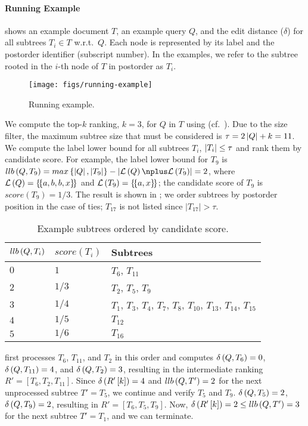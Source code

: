 \paragraph{Running Example}

 shows an example document $T$, an example query $Q$, and the edit distance ($\delta$) for all subtrees $T_i \in T$ w.r.t.\ $Q$. Each node is represented by its label and the postorder identifier (subscript number). In the examples, we refer to the  subtree rooted in the $i$-th node of $T$ in postorder as $T_i$.

\begin{figure}[H]
  \centering
  \texttt{[image: figs/running-example]}
  \caption{Running example.}
  \label{fig:running-example}
\end{figure}

\begin{example}

We compute the top-$k$ ranking, $k = 3$, for $Q$ in $T$ using \simplealg{} (cf.\ ). Due to the size filter, the maximum subtree size that must be considered is $\tau = 2\left| Q \right| + k = 11$. We compute the label lower bound for all subtrees $T_i$, $\left| T_i \right| \leq \tau$ and rank them by candidate score.
%
For example, the label lower bound for $T_9$ is $\LLBshort{Q}{T_9} = \LLB{Q}{T_9} = 2$, where $\mathcal{L} \left( Q \right) = \left\{\!\left\{ a, b, b, x \right\}\!\right\}$ and $\mathcal{L} \left( T_9 \right) = \left\{\!\left\{ a, x \right\}\!\right\}$; the candidate score of $T_9$ is $score(T_9) = 1/3$.
%
The result is shown in ; we order subtrees by postorder position in the case of ties; $T_{17}$ is not listed since $|T_{17}|>\tau$.
\parskip0pt\begin{table}[H]
  \centering
  \caption{Example subtrees ordered by candidate score.}
  \label{tbl:all-llbs-running-example-q1}
  \begin{tabular}{l|l|l}
    $llb \left( Q, T_i \right)$ & $score(T_i)$ & Subtrees \tabularnewline
    \hline\hline
    $0$ & $1$ & $T_6$, $T_{11}$ \tabularnewline
    \hline
    $2$ & $1/3$ & $T_2$, $T_5$, $T_9$ \tabularnewline
    \hline
    $3$ & $1/4$ & $T_1$, $T_3$, $T_4$, $T_7$, $T_8$, $T_{10}$, $T_{13}$, $T_{14}$, $T_{15}$ \tabularnewline
    \hline
    $4$ & $1/5$ & $T_{12}$ \tabularnewline
    \hline
    $5$ & $1/6$ & $T_{16}$ \tabularnewline
    \hline
  \end{tabular}
\end{table}

\simplealg{} first processes $T_6$, $T_{11}$, and $T_2$ in this order and computes $\delta \left( Q, T_6 \right) = 0$, $\delta \left( Q, T_{11} \right) = 4$, and $\delta \left( Q, T_2 \right) = 3$, resulting in the intermediate ranking $R' = \left[ T_6, T_2, T_{11} \right]$.
%
Since $\delta \left( R'\left[ k \right] \right) = 4$ and $llb \left( Q, T' \right) = 2$ for the next unprocessed subtree $T' = T_5$, we continue and verify $T_5$ and $T_9$. $\delta \left( Q, T_5 \right) = 2$, $\delta \left( Q, T_9 \right) = 2$, resulting in $R' = \left[ T_6, T_5, T_9 \right]$.
%
Now, $\delta \left( R'\left[ k \right] \right) = 2 \leq llb \left( Q, T' \right) = 3$ for the next subtree $T' = T_1$, and we can terminate.
\end{example}
